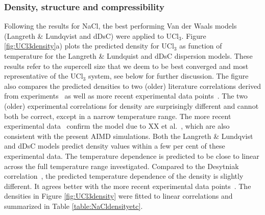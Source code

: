 \documentclass[preprint,3p,10pt,twocolumn,number,sort&compress]{elsarticle}
\begin{document}
\subsubsection{Density, structure and compressibility}
Following the results for NaCl, the best performing Van der Waals models (Langreth \& Lundqvist and dDsC) were applied to UCl$_3$. %
Figure \ref{fig:UCl3density}a) plots the predicted density for UCl$_3$ as function of temperature for the Langreth \& Lundquist and dDsC dispersion models. 
These results refer to the supercell size that we deem to be best converged and most representative of the UCl$_3$ system, see below for further discussion. 
The figure also compares the predicted densities to two (older) literature correlations derived from experiments~\cite{} as well as more recent experimental data points~\cite{}. 
The two (older) experimental correlations for density are surprisingly different and cannot both be correct, except in a narrow temperature range. The more recent experimental data~\cite{} confirm the model due to XX et al.~\cite{}, which are also consistent with the present AIMD simulations. Both the Langreth \& Lundqvist and dDsC models predict density values within a few per cent of these experimental data.
 The temperature dependence is predicted to be close to linear across the full temperature range investigated. %
 Compared to the Desytniak correlation~\cite{}, the predicted temperature dependence of the density is slightly different. It agrees better with the more recent experimental data points~\cite{XX}. The densities in Figure \ref{fig:UCl3density} were fitted to linear correlations and summarized in Table \ref{table:NaCldensityetc}. 
 
\end{document}
